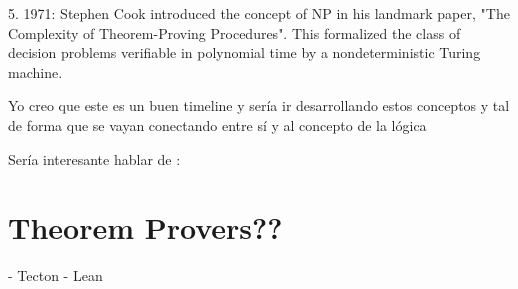 \documentclass{article}
\begin{document}
5. 1971: Stephen Cook introduced the concept of NP in his landmark paper, "The Complexity of Theorem-Proving Procedures". This formalized the class of decision problems verifiable in polynomial time by a nondeterministic Turing machine.

Yo creo que este es un buen timeline y sería ir desarrollando estos conceptos y tal de forma que se vayan conectando entre sí y al concepto de la lógica



Sería interesante hablar de :


\section{Theorem Provers??}
- Tecton
- Lean



\renewcommand{\refname}{Referencias}


\end{document}
